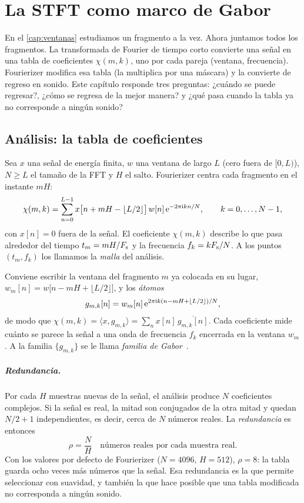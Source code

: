 \chapter{La STFT como marco de Gabor}\label{cap:stft}

En el \cref{cap:ventanas} estudiamos un fragmento a la vez. Ahora juntamos todos los fragmentos.
La transformada de Fourier de tiempo corto convierte una señal en una tabla de coeficientes
$\chi(m,k)$, uno por cada pareja (ventana, frecuencia). Fourierizer modifica esa tabla (la
multiplica por una máscara) y la convierte de regreso en sonido. Este capítulo responde tres
preguntas: ¿cuándo se puede regresar?, ¿cómo se regresa de la mejor manera? y ¿qué pasa cuando
la tabla ya no corresponde a ningún sonido?

\section{Análisis: la tabla de coeficientes}

Sea $x$ una señal de energía finita, $w$ una ventana de largo $L$ (cero fuera de $[0,L)$), $N\ge L$
el tamaño de la FFT y $H$ el salto. Fourierizer centra cada fragmento en el instante $mH$:
\[
  \chi(m,k)=\sum_{n=0}^{L-1}x\bigl[n+mH-\lfloor L/2\rfloor\bigr]\,w[n]\,\mathrm{e}^{-2\pi\mathrm{i} kn/N},
  \qquad k=0,\dots,N-1,
\]
con $x[n]=0$ fuera de la señal. El coeficiente $\chi(m,k)$ describe lo que pasa alrededor del
tiempo $t_m=mH/F_{\mathrm{s}}$ y la frecuencia $f_k=kF_{\mathrm{s}}/N$. A los puntos $(t_m,f_k)$ los llamamos la
\emph{malla} del análisis.

Conviene escribir la ventana del fragmento $m$ ya colocada en su lugar,
$w_m[n]=w\bigl[n-mH+\lfloor L/2\rfloor\bigr]$, y los \emph{átomos}
\[
  g_{m,k}[n]=w_m[n]\,\mathrm{e}^{2\pi\mathrm{i} k(n-mH+\lfloor L/2\rfloor)/N},
\]
de modo que $\chi(m,k)=\langle x,g_{m,k}\rangle=\sum_n x[n]\,\overline{g_{m,k}[n]}$. Cada
coeficiente mide cuánto se parece la señal a una onda de frecuencia $f_k$ encerrada en la ventana
$w_m$. A la familia $\{g_{m,k}\}$ se le llama \emph{familia de Gabor}~\cite{grochenig2001}.

\paragraph{Redundancia.} Por cada $H$ muestras nuevas de la señal, el análisis produce $N$
coeficientes complejos. Si la señal es real, la mitad son conjugados de la otra mitad y quedan
$N/2+1$ independientes, es decir, cerca de $N$ números reales. La \emph{redundancia} es entonces
\[
  \rho=\frac{N}{H}\quad\text{números reales por cada muestra real.}
\]
Con los valores por defecto de Fourierizer ($N=4096$, $H=512$), $\rho=8$: la tabla guarda ocho
veces más números que la señal. Esa redundancia es la que permite seleccionar con suavidad, y
también la que hace posible que una tabla modificada no corresponda a ningún sonido.

